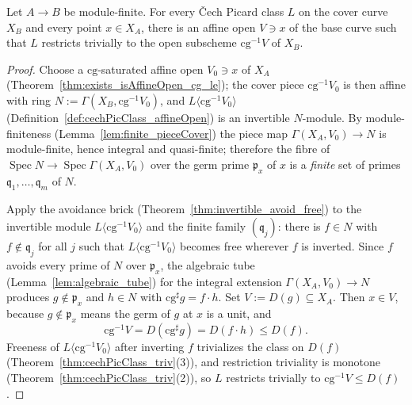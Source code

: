 \begin{theorem}
  \label{thm:moving_lemma}
  \leanok
  Let \(A \to B\) be module-finite. For every \v Cech Picard class \(L\) on the cover curve \(X_B\)
  and every point \(x \in X_A\), there is an affine open \(V \ni x\) of the base curve such that \(L\)
  restricts trivially to the open subscheme \(\mathrm{cg}^{-1}V\) of \(X_B\).
\end{theorem}
\begin{proof}
  \leanok
  Choose a \(\mathrm{cg}\)-saturated affine open \(V_0 \ni x\) of \(X_A\)
  (Theorem~\ref{thm:exists_isAffineOpen_cg_le}); the cover piece \(\mathrm{cg}^{-1}V_0\) is then
  affine with ring \(N := \Gamma(X_B, \mathrm{cg}^{-1}V_0)\), and \(L\langle \mathrm{cg}^{-1}V_0
  \rangle\) (Definition~\ref{def:cechPicClass_affineOpen}) is an invertible \(N\)-module. By
  module-finiteness (Lemma~\ref{lem:finite_pieceCover}) the piece map \(\Gamma(X_A, V_0) \to N\) is
  module-finite, hence integral and quasi-finite; therefore the fibre of \(\operatorname{Spec} N \to
  \operatorname{Spec}\Gamma(X_A, V_0)\) over the germ prime \(\mathfrak p_x\) of \(x\) is a
  \emph{finite} set of primes \(\mathfrak q_1, \dots, \mathfrak q_m\) of \(N\).

  Apply the avoidance brick (Theorem~\ref{thm:invertible_avoid_free}) to the invertible module
  \(L\langle \mathrm{cg}^{-1}V_0\rangle\) and the finite family \((\mathfrak q_j)\): there is \(f \in
  N\) with \(f \notin \mathfrak q_j\) for all \(j\) such that \(L\langle \mathrm{cg}^{-1}V_0\rangle\)
  becomes free wherever \(f\) is inverted. Since \(f\) avoids every prime of \(N\) over \(\mathfrak
  p_x\), the algebraic tube (Lemma~\ref{lem:algebraic_tube}) for the integral extension \(\Gamma(X_A,
  V_0) \to N\) produces \(g \notin \mathfrak p_x\) and \(h \in N\) with \(\mathrm{cg}^{\sharp}g = f
  \cdot h\). Set \(V := D(g) \subseteq X_A\). Then \(x \in V\), because \(g \notin \mathfrak p_x\)
  means the germ of \(g\) at \(x\) is a unit, and
  \[
    \mathrm{cg}^{-1}V = D(\mathrm{cg}^{\sharp}g) = D(f \cdot h) \le D(f) .
  \]
  Freeness of \(L\langle \mathrm{cg}^{-1}V_0\rangle\) after inverting \(f\) trivializes the class on
  \(D(f)\) (Theorem~\ref{thm:cechPicClass_triv}(3)), and restriction triviality is monotone
  (Theorem~\ref{thm:cechPicClass_triv}(2)), so \(L\) restricts trivially to \(\mathrm{cg}^{-1}V \le
  D(f)\).


\end{proof}
